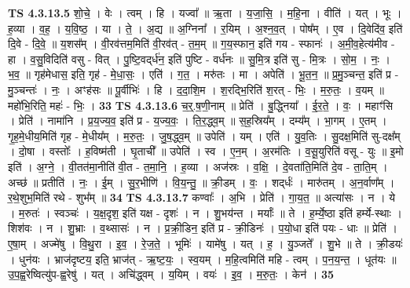 \documentclass[17pt]{extarticle}
\begin{document}
                  \newline
                                \textbf{ TS 4.3.13.5} \newline
                  शो॒चे॒ । वेः । त्वम् । हि । यज्वा᳚ ॥ ऋ॒ता । य॒जा॒सि॒ । म॒हि॒ना । वीति॑ । यत् । भूः । ह॒व्या । व॒ह॒ । य॒वि॒ष्ठ॒ । या । ते॒ । अ॒द्य ॥ अ॒ग्निना᳚ । र॒यिम् । अ॒श्न॒व॒त् । पोष᳚म् । ए॒व । दि॒वेदि॑व॒ इति॑ दि॒वे - दि॒वे॒ ॥ य॒शस᳚म् । वी॒रव॑त्तम॒मिति॑ वी॒रव॑त् - त॒म॒म् ॥ ग॒य॒स्फान॒ इति॑ गय - स्फानः॑ । अ॒मी॒व॒हेत्य॑मीव - हा । व॒सु॒विदिति॑ वसु - वित् । पु॒ष्टि॒वद्‌र्ध॑न॒ इति॑ पुष्टि - वर्ध॑नः ॥ सु॒मि॒त्र इति॑ सु - मि॒त्रः । सो॒म॒ । नः॒ । भ॒व॒ ॥ गृह॑मेधास॒ इति॒ गृह॑ - मे॒धा॒सः॒ । एति॑ । ग॒त॒ । मरु॑तः । मा । अपेति॑ । भू॒त॒न॒ ॥ प्र॒मु॒ञ्चन्त॒ इति॑ प्र - मु॒ञ्चन्तः॑ । नः॒ । अꣳह॑सः ॥ पू॒र्वीभिः॑ । हि । द॒दा॒शि॒म । श॒रद्भि॒रिति॑ श॒रत् - भिः॒ । म॒रु॒तः॒ । व॒यम् ॥ महो॑भि॒रिति॒ महः॑ - भिः॒ । \textbf{  33 } \newline
                  \newline
                                \textbf{ TS 4.3.13.6} \newline
                  च॒र्॒.ष॒णी॒नाम् ॥ प्रेति॑ । बु॒द्ध्निया᳚ । ई॒र॒ते॒ । वः॒ । महाꣳ॑सि । प्रेति॑ । नामा॑नि । प्र॒य॒ज्य॒व॒ इति॑ प्र - य॒ज्य॒वः॒ । ति॒र॒द्ध्व॒म् ॥ स॒ह॒स्रिय᳚म् । दम्य᳚म् । भा॒गम् । ए॒तम् । गृ॒ह॒मे॒धीय॒मिति॑ गृह - मे॒धीय᳚म् । म॒रु॒तः॒ । जु॒ष॒द्ध्व॒म् ॥ उपेति॑ । यम् । एति॑ । यु॒व॒तिः । सु॒दक्ष॒मिति॑ सु-दक्ष᳚म् । दो॒षा । वस्तोः᳚ । ह॒विष्म॑ती । घृ॒ताची᳚ ॥ उपेति॑ । स्व । ए॒न॒म् । अ॒रम॑तिः । व॒सू॒युरिति॑ वसू - युः ॥ इ॒मो इति॑ । अ॒ग्ने॒ । वी॒तत॑मा॒नीति॑ वी॒त - त॒मा॒नि॒ । ह॒व्या । अज॑स्रः । व॒क्षि॒ । दे॒वता॑ति॒मिति॑ दे॒व - ता॒ति॒म् । अच्छ॑ ॥ प्रतीति॑ । नः॒ । ई॒म् । सु॒र॒भीणि॑ । वि॒य॒न्तु॒ ॥ क्री॒डम् । वः॒ । शद्‌र्धः॑ । मारु॑तम् । अ॒न॒र्वाण᳚म् । र॒थे॒शुभ॒मिति॑ रथे - शुभ᳚म् ॥ \textbf{  34} \newline
                  \newline
                                \textbf{ TS 4.3.13.7} \newline
                  कण्वाः᳚ । अ॒भि । प्रेति॑ । गा॒य॒त॒ ॥ अत्या॑सः । न । ये । म॒रुतः॑ । स्वञ्चः॑ । य॒क्ष॒दृश॒ इति॑ यक्ष - दृशः॑ । न । शु॒भय॑न्त । मर्याः᳚ ॥ ते । ह॒र्म्ये॒ष्ठा इति॑ हर्म्ये-स्थाः । शिश॑वः । न । शु॒भ्राः । व॒थ्सासः॑ । न । प्र॒क्री॒डिन॒ इति॑ प्र - क्री॒डिनः॑ । प॒यो॒धा इति॑ पयः - धाः ॥ प्रेति॑ । ए॒षा॒म् । अज्मे॑षु । वि॒थु॒रा । इ॒व॒ । रे॒ज॒ते॒ । भूमिः॑ । यामे॑षु । यत् । ह॒ । यु॒ञ्जते᳚ । शु॒भे ॥ ते । क्री॒डयः॑ । धुन॑यः । भ्राज॑दृष्टय॒ इति॒ भ्राज॑त् - ऋ॒ष्ट॒यः॒ । स्व॒यम् । म॒हि॒त्वमिति॑ महि - त्वम् । प॒न॒य॒न्त॒ । धूत॑यः ॥ उ॒प॒ह्व॒रेष्वित्यु॑प-ह्व॒रेषु॑ । यत् । अचि॑द्ध्वम् । य॒यिम् । वयः॑ । इ॒व॒ । म॒रु॒तः॒ । केन॑ । \textbf{  35} \newline
\end{document}
